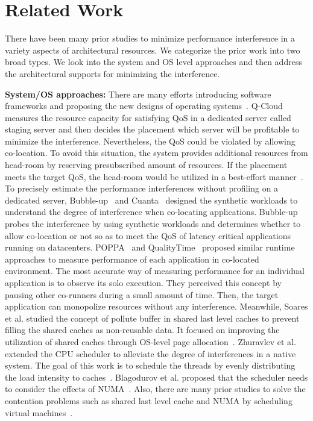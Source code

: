 \documentclass{sig-alternate}
\begin{document}
\section{Related Work}
\label{sec:RelatedWork}

There have been many prior studies to minimize performance interference in a variety aspects of architectural resources. We categorize the prior work into two broad types. We look into the system and OS level approaches and then address the architectural supports for minimizing the interference.

{\bf System/OS  approaches: } There are many efforts introducing software frameworks and proposing the new designs of operating systems~\cite{Govindan:2011:CQE:2038916.2038938,bubbleup,Yang:2013:BPO:2485922.2485974,Tang:2013:RRS:2451116.2451126,Nathuji:2010:QMP:1755913.1755938, Park:2013:RCH:2451116.2451137, Liu:2014:GVM:2665671.2665698}. 
Q-Cloud measures the resource capacity for satisfying QoS in a dedicated server called staging server and then decides the placement which server will be profitable to minimize the interference. Nevertheless, the QoS could be violated by allowing co-location. To avoid this situation, the system provides additional resources from head-room by reserving presubscribed amount of resources. If the placement meets the target QoS, the head-room would be utilized in a best-effort manner~\cite{Nathuji:2010:QMP:1755913.1755938}. To  precisely estimate the performance interferences without profiling on a dedicated server, Bubble-up~\cite{bubbleup} and Cuanta~\cite{Govindan:2011:CQE:2038916.2038938} designed the synthetic workloads to understand the degree of interference when co-locating applications. Bubble-up probes the interference by using synthetic workloads and determines whether to allow co-location or not so as to meet the QoS of latency critical applications running on datacenters. POPPA~\cite{fairpricing} and QualityTime~\cite{6844481} proposed similar runtime approaches to measure performance of each application in co-located environment. The most accurate way of measuring performance for an individual application is to observe its solo execution. They perceived this concept by pausing other co-runners during a small amount of time. Then, the target application can monopolize resources without any interference. Meanwhile, Soares et al. studied the concept of pollute buffer in shared last level caches to prevent filling the shared caches as non-reusable data. It focused on improving the utilization of shared caches through OS-level page allocation~\cite{Soares:2008:RHE:1521747.1521800}. Zhuravlev et al. extended the CPU scheduler to alleviate the degree of interferences in a native system. The goal of this work is to schedule the threads by evenly distributing the load intensity to caches~\cite{Zhuravlev:2010:ASR:1736020.1736036}. Blagodurov et al. proposed that the scheduler needs to consider the effects of NUMA~\cite{Blagodurov:2011:CNC:2002181.2002182}. Also, there are many prior studies to solve the contention problems such as shared last level cache and NUMA by scheduling virtual machines~\cite{Ahn:2012:DVM:2342763.2342782,6522328,Liu:2014:OVM:2665671.2665720}.
\end{document}
